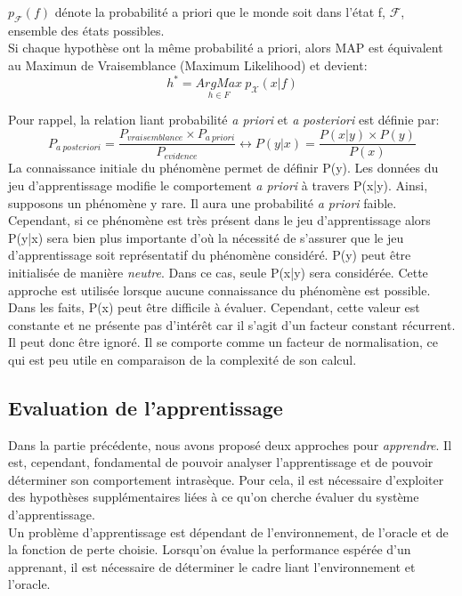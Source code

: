 \noindent $p_{\mathcal{F}}(f)$ dénote la probabilité a priori que le monde soit dans l'état f, $\mathcal{F}$, ensemble des états possibles.\\

\noindent Si chaque hypothèse ont la même probabilité a priori, alors MAP est équivalent au Maximun de Vraisemblance (Maximum Likelihood) et devient:
$$h^*=\underset{h \in F}{ArgMax} \ p_{\mathcal{X}}(x|f)$$

\noindent Pour rappel, la relation liant probabilité \textit{a priori} et \textit{a posteriori} est définie par:
$$P_{a \ posteriori} = \frac{P_{vraisemblance} \times P_{a \ priori}}{P_{evidence}} \leftrightarrow P(y|x)=\frac{P(x|y) \times P(y)}{P(x)}$$
\noindent La connaissance initiale du phénomène permet de définir P(y). Les données du jeu d'apprentissage modifie le comportement \textit{a priori} à travers P(x|y). Ainsi, supposons un phénomène y rare. Il aura une probabilité \textit{a priori} faible. Cependant, si ce phénomène est très présent dans le jeu d'apprentissage alors P(y|x) sera bien plus importante d'où la nécessité de s'assurer que le jeu d'apprentissage soit représentatif du phénomène considéré. P(y) peut être initialisée de manière \textit{neutre}. Dans ce cas, seule P(x|y) sera considérée. Cette approche est utilisée lorsque aucune connaissance du phénomène est possible.\\

\noindent Dans les faits, P(x) peut être difficile à évaluer. Cependant, cette valeur est constante et ne présente pas d'intérêt car il s'agit d'un facteur constant récurrent. Il peut donc être ignoré. Il se comporte comme un facteur de normalisation, ce qui est peu utile en comparaison de la complexité de son calcul.

\subsection{Evaluation de l'apprentissage}
Dans la partie précédente, nous avons proposé deux approches pour \textit{apprendre}. Il est, cependant, fondamental de pouvoir analyser l'apprentissage et de pouvoir déterminer son comportement intrasèque. Pour cela, il est nécessaire d'exploiter des hypothèses supplémentaires liées à ce qu'on cherche évaluer du système d'apprentissage.\\

\noindent Un problème d'apprentissage est dépendant de l'environnement, de l'oracle et de la fonction de perte choisie. Lorsqu'on évalue la performance espérée d'un apprenant, il est nécessaire de déterminer le cadre liant l'environnement et l'oracle.\\

